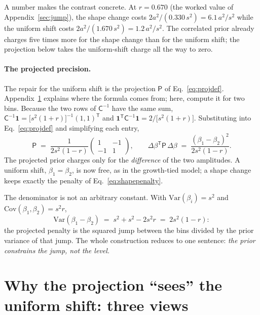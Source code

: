 \documentclass[11pt]{article}
\newcommand{\ones}{\mathbf{1}} %
\newcommand{\Cov}{\mathsf{C}}
\newcommand{\Prec}{\mathsf{P}}
\newcommand{\T}{^{\mathsf{T}}}
\begin{document}
A number makes the contrast concrete.  At $r = 0.670$ (the worked value
of Appendix~\ref{sec:jump}), the shape change costs
$2a^2/(0.330\,s^2) = 6.1\,a^2/s^2$ while the uniform shift costs
$2a^2/(1.670\,s^2) = 1.2\,a^2/s^2$.  The correlated prior already
charges five times more for the shape change than for the uniform
shift; the projection below takes the uniform-shift charge all the way
to zero.

\paragraph{The projected precision.}
The repair for the uniform shift is the projection $\Prec$ of
Eq.~\eqref{eq:projdef}.  Appendix~\ref{sec:threeviews} explains where
the formula comes from; here, compute it for two bins.
Because the two rows of $\Cov^{-1}$ have the
same sum, $\Cov^{-1}\ones = \bigl[s^2 (1+r)\bigr]^{-1} (1,1)\T$ and
$\ones\T \Cov^{-1} \ones = 2 / \bigl[s^2 (1+r)\bigr]$.  Substituting
into Eq.~\eqref{eq:projdef} and simplifying each entry,
\begin{equation}
  \Prec \;=\;
  \frac{1}{2 s^2 (1 - r)}
  \begin{pmatrix} 1 & -1 \\ -1 & 1 \end{pmatrix},
  \qquad
  \Delta\beta\T \Prec\, \Delta\beta
  \;=\;
  \frac{(\beta_1 - \beta_2)^2}{2 s^2 (1 - r)} .
  \label{eq:twobinP}
\end{equation}
The projected prior charges only for the \emph{difference} of the two
amplitudes.  A uniform shift, $\beta_1 = \beta_2$, is now free, as in
the growth-tied model; a shape change keeps exactly the penalty of
Eq.~\eqref{eq:shapepenalty}.

The denominator is not an arbitrary constant.  With
$\mathrm{Var}(\beta_i) = s^2$ and
$\mathrm{Cov}(\beta_1, \beta_2) = s^2 r$,
\begin{equation}
  \mathrm{Var}(\beta_1 - \beta_2)
  \;=\; s^2 + s^2 - 2 s^2 r
  \;=\; 2 s^2 (1 - r):
  \label{eq:jumpvar2}
\end{equation}
the projected penalty is the squared jump between the bins divided by
the prior variance of that jump.  The whole construction reduces to one
sentence: \emph{the prior constrains the jump, not the level.}

\section{Why the projection ``sees'' the uniform shift: three views}
\label{sec:threeviews}
\end{document}

